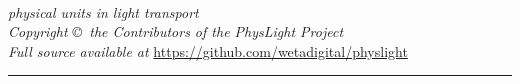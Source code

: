 %

\renewcommand{\d}{\mathop{}\!\mathrm{d}}

\newcommand{\todo}[1]{\begin{tcolorbox}[colback=red!5!white,colframe=red!75!black,title=TODO]{#1}\end{tcolorbox}}

\graphicspath{{figures/}}


\begin{titlepage}
\begin{center}

{\fontsize{60}{72}\selectfont \physLight}\\[.3cm]

\textsf{\textit{\fontsize{24}{26.8}\selectfont physical units in light transport}}\\[1.5cm]

\vfill
\large
\textit{Copyright \copyright\ the Contributors of the PhysLight Project}\\[1mm]
\textit{Full source available at} \url{https://github.com/wetadigital/physlight}\\[1mm]

%

\hrule \vspace{1mm}
\textsc{\large \physLightVersion}\\[0.5cm]

\end{center}
\end{titlepage}

\tableofcontents
\listoffigures
\listoftables


